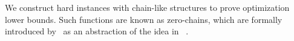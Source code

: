 \documentclass{article}
\begin{document}

We construct hard instances with chain-like structures to prove optimization lower bounds.
Such functions are known as zero-chains, which are 
formally introduced by~\citet{carmon2020lower} as an abstraction of the idea in ~\citep{nesterov2018lectures}. 





\end{document}
